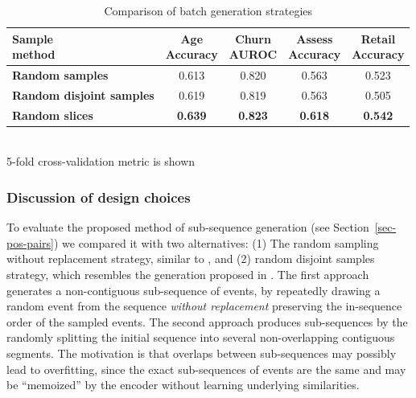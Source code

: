 \documentclass[sigconf]{acmart}
\newcommand{\revised}[1]{#1}
\begin{document}
\begin{table}
    \centering
    \caption{Comparison of batch generation strategies}
    \begin{tabularx}{\linewidth}{Xcccc}
        \toprule
            \makecell{\textbf{Sample} \\ \textbf{method}} &
            \makecell{\textbf{Age} \\ \small{Accuracy}} &
            \makecell{\textbf{Churn} \\ \small{AUROC}} &
            \makecell{\textbf{Assess} \\ \small{Accuracy}} &
            \makecell{\textbf{Retail} \\ \small{Accuracy}} \\
        \midrule
            \textbf{Random samples} & 0.613 & 0.820 & 0.563 & 0.523 \\
            \textbf{Random disjoint samples} & 0.619 & 0.819 & 0.563 & 0.505 \\
            \textbf{Random slices} & \textbf{0.639} & \textbf{0.823} & \textbf{0.618} & \textbf{0.542} \\
        \bottomrule
    \end{tabularx}%
    \\
    \small{5-fold cross-validation metric is shown}
    \label{tab-pair-gen}
\end{table}

\subsubsection{Discussion of design choices} \label{sec-ablation}

To evaluate the proposed method of sub-sequence generation (see Section~\ref{sec-pos-pairs})
we compared it with two alternatives: \revised{
    (1) The random sampling without replacement strategy, similar to
    \citep{Yao2020SelfsupervisedLF}, and
    (2) random disjoint samples strategy, which resembles the generation
    proposed in \citep{Ma2020DisentangledSI}.
    The first approach generates a non-contiguous sub-sequence of events, by
    repeatedly drawing a random event from the sequence \emph{without replacement}
    preserving the in-sequence order of the sampled events.
    The second approach produces sub-sequences by the randomly splitting
    the initial sequence into several non-overlapping contiguous segments.
    The motivation is that overlaps between sub-sequences may possibly lead to
    overfitting, since the exact sub-sequences of events are the same and may be
    ``memoized'' by the encoder without learning underlying similarities.
}
\end{document}
